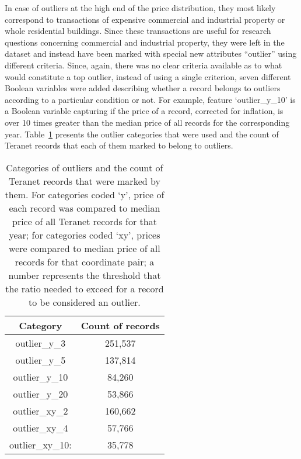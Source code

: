 In case of outliers at the high end of the price distribution, they most likely correspond to transactions of expensive commercial and industrial property or whole residential buildings.
Since these transactions are useful for research questions concerning commercial and industrial property, they were left in the dataset and instead have been marked with special new attributes ``outlier'' using different criteria.
Since, again, there was no clear criteria available as to what would constitute a top outlier, instead of using a single criterion, seven different Boolean variables were added describing whether a record belongs to outliers according to a particular condition or not.
For example, feature `outlier\_y\_10' is a Boolean variable capturing if the price of a record, corrected for inflation, is over 10 times greater than the median price of all records for the corresponding year.
Table~\ref{tab:outliers} presents the outlier categories that were used and the count of Teranet records that each of them marked to belong to outliers.

\begin{table}[h!]
    \centering
    \begin{tabular}{|| c | c ||}
        \hline
        Category & Count of records \\
        \hline
        \hline
        outlier\_y\_3 & 251,537 \\
        \hline
        outlier\_y\_5 & 137,814 \\
        \hline
        outlier\_y\_10 & 84,260 \\
        \hline
        outlier\_y\_20 & 53,866 \\
        \hline
        outlier\_xy\_2 & 160,662 \\
        \hline
        outlier\_xy\_4 & 57,766 \\
        \hline
        outlier\_xy\_10: & 35,778 \\
        \hline
    \end{tabular}
    \caption{Categories of outliers and the count of Teranet records that were marked by them.
    For categories coded `y', price of each record was compared to median price of all Teranet records for that year;
    for categories coded `xy', prices were compared to median price of all records for that coordinate pair;
    a number represents the threshold that the ratio needed to exceed for a record to be considered an outlier.}
    \label{tab:outliers}

\end{table}

